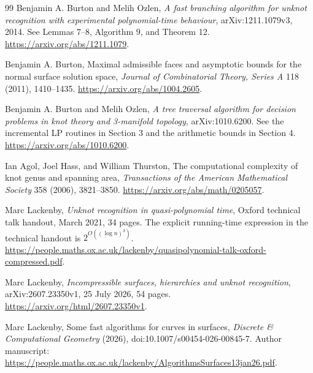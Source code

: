 \begin{thebibliography}{99}
Benjamin A. Burton and Melih Ozlen, \emph{A fast branching algorithm for
unknot recognition with experimental polynomial-time behaviour},
arXiv:1211.1079v3, 2014. See Lemmas 7--8, Algorithm 9, and Theorem 12.
\url{https://arxiv.org/abs/1211.1079}.

Benjamin A. Burton, Maximal admissible faces and asymptotic bounds for
the normal surface solution space, \emph{Journal of Combinatorial Theory,
Series A} 118 (2011), 1410--1435.
\url{https://arxiv.org/abs/1004.2605}.

Benjamin A. Burton and Melih Ozlen, \emph{A tree traversal algorithm for
decision problems in knot theory and 3-manifold topology},
arXiv:1010.6200. See the incremental LP routines in Section 3 and the
arithmetic bounds in Section 4.
\url{https://arxiv.org/abs/1010.6200}.

Ian Agol, Joel Hass, and William Thurston, The computational complexity
of knot genus and spanning area, \emph{Transactions of the American
Mathematical Society} 358 (2006), 3821--3850.
\url{https://arxiv.org/abs/math/0205057}.

Marc Lackenby, \emph{Unknot recognition in quasi-polynomial time},
Oxford technical talk handout, March 2021, 34 pages.
The explicit running-time expression in the technical handout is
$2^{O((\log n)^3)}$.
\url{https://people.maths.ox.ac.uk/lackenby/quasipolynomial-talk-oxford-compressed.pdf}.

Marc Lackenby, \emph{Incompressible surfaces, hierarchies and unknot
recognition}, arXiv:2607.23350v1, 25 July 2026, 54 pages.
\url{https://arxiv.org/html/2607.23350v1}.

Marc Lackenby, Some fast algorithms for curves in surfaces,
\emph{Discrete \& Computational Geometry} (2026),
doi:10.1007/s00454-026-00845-7. Author manuscript:
\url{https://people.maths.ox.ac.uk/lackenby/AlgorithmsSurfaces13jan26.pdf}.

\end{thebibliography}

